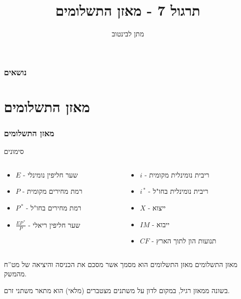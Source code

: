 \documentclass[10pt,usenames,dvipsnames]{beamer}
\title[מאזן התשלומים]{תרגול 7 - מאזן התשלומים}
\author{מתן לבינטוב}
\institute[{{אב"ג}}]{{ אוניברסיטת בן גוריון בנגב}}
\date{}
\begin{document}
\begin{RTL}
\begin{frame}
\titlepage
\end{frame}
\begin{frame}
    \frametitle{נושאים}
    \tableofcontents
\end{frame}

\section{מאזן התשלומים}
\begin{frame}[allowframebreaks]
    \frametitle{מאזן התשלומים}
    \begin{block}{סימונים}
    \begin{columns}
        \begin{column}{0.48\textwidth}
            \begin{itemize}
                \item $E$ - שער חליפין נומינלי
                \item $P$ - רמת מחירים מקומית
                \item $P^{\, \ast}$ - רמת מחירים בחו"ל
                \item $\frac{E P^{\, \ast}}{P}$ - שער חליפין ריאלי
                \end{itemize}
        \end{column}
        \begin{column}{0.48\textwidth}
            \begin{itemize}
                \item $i$ - ריבית נומינלית מקומית
                \item $i^{\, \ast}$ - ריבית נומינלית בחו"ל
                \item $X$ - ייצוא
                \item $IM$ - ייבוא
                \item $CF$ - תנועות הון לתוך הארץ
                \end{itemize}
        \end{column}
    \end{columns}
    \end{block}

    \framebreak

    \begin{block}{מאזן התשלומים}
        מאזן התשלומים הוא מסמך אשר מסכם את הכניסה והיציאה של מט''ח מהמשק.

        בשונה ממאזן רגיל, במקום לדון על משתנים מצטברים (מלאי) 
        הוא מתאר משתני זרם.


\end{block}
\end{frame}
\end{RTL}
\end{document}
